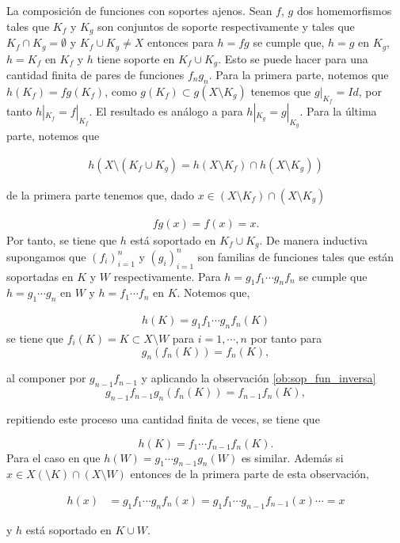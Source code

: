 \begin{ob}\label{ob:efecto_soporte}
La composición de funciones con soportes ajenos. Sean $f$, $g$ dos homemorfismos tales que $K_f$ y $K_g$ son conjuntos de soporte respectivamente y tales que  $K_f \cap K_g = \emptyset$ y $K_f \cup K_g \neq X$ entonces para $h=fg$ se cumple que, $h=g$ en  $ K_g$, $h=K_f$ en $K_f$ y $h$ tiene soporte en $K_f \cup K_g$. Esto se puede hacer para una cantidad finita de pares de funciones $f_ng_n.$  Para la primera parte, notemos que  $h(K_f)=fg(K_f)$, como $g(K_f) \subset g(X \setminus K_g)$ tenemos que $g|_{K_f}=Id$, por tanto $h|_{K_f}=f|_{K_f}$. El resultado es análogo a para $h|_{K_g}=g|_{K_g}$. Para la última parte, notemos que 
 
\begin{align*}
h( X \setminus (K_f \cup K_g)= h(X \setminus K_f) \cap h(X \setminus K_g))
\end{align*} 

de la primera parte tenemos que, dado $x \in (X \setminus K_f) \cap (X \setminus K_g)$

\begin{align*}
fg(x)= f(x)=x.
\end{align*} 
Por tanto, se tiene que $h$ está soportado en $K_f \cup K_g.$ De manera inductiva supongamos que $(f_i)_{i = 1}^n$ y $(g_i)_{i = 1}^n$ son familias de funciones tales que están soportadas en $K$ y $W$ respectivamente. Para $h = g_1f_1 \cdots g_n f_n$ se cumple que $h= g_1 \cdots g_n$ en $W$ y $h=f_1 \cdots f_n$ en $K.$ Notemos que, 
 
\begin{align*}
h(K)= g_1f_1 \cdots g_n f_n(K)
\end{align*}
 se tiene que $f_i(K)= K \subset X \setminus W$ para $i = 1 , \cdots ,n$ por tanto para $$g_n(f_n(K))=f_n(K),$$
 
 al componer por $g_{n-1}f_{n-1}$ y  aplicando la observación \ref{ob:sop_fun_inversa}
 $$g_{n-1}f_{n-1}g_n(f_n(K))=f_{n-1}f_n(K),$$

repitiendo este proceso una cantidad finita de veces, se tiene que

 $$h(K)=f_1 \cdots f_{n-1}f_n(K).$$
Para el caso en que $h(W)= g_1 \cdots g_{n-1}g_n(W)$ es similar.  Además si $x \in X (\setminus K) \cap (X \setminus W)$ entonces de la primera parte de esta observación,

\begin{align*}
h(x) & = g_1f_1 \cdots g_n f_n(x) = g_1f_1 \cdots g_{n-1 }f_{n-1}(x) \cdots = x
\end{align*}

y $h$ está soportado en $K \cup W.$
\end{ob}
 
